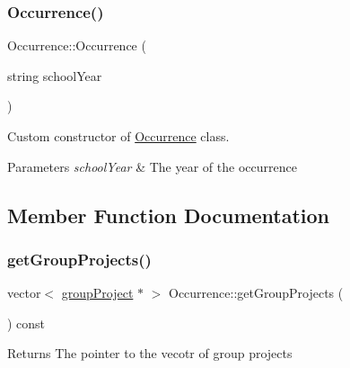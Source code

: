 \mbox{\label{class_occurrence_aa1aa3a08a982d5c15a14a3fd0dc835fe}} 
\subsubsection{\texorpdfstring{Occurrence()}{Occurrence()}\hspace{0.1cm}{\footnotesize\ttfamily [2/2]}}
{\footnotesize\ttfamily Occurrence\+::\+Occurrence (\begin{DoxyParamCaption}\item[{string}]{school\+Year }\end{DoxyParamCaption})}



Custom constructor of \hyperlink{class_occurrence}{Occurrence} class. 


\begin{DoxyParams}{Parameters}
{\em school\+Year} & The year of the occurrence \\
\hline
\end{DoxyParams}


\subsection{Member Function Documentation}
\mbox{\label{class_occurrence_ab6e9beff62ff5738494b2618b850543b}} 
\subsubsection{\texorpdfstring{get\+Group\+Projects()}{getGroupProjects()}}
{\footnotesize\ttfamily vector$<$ \hyperlink{classgroup_project}{group\+Project} $\ast$ $>$ Occurrence\+::get\+Group\+Projects (\begin{DoxyParamCaption}{ }\end{DoxyParamCaption}) const}

\begin{DoxyReturn}{Returns}
The pointer to the vecotr of group projects 
\end{DoxyReturn}
\mbox{\label{class_occurrence_afc85c969e4211d55707b759b0b58eda0}} 
